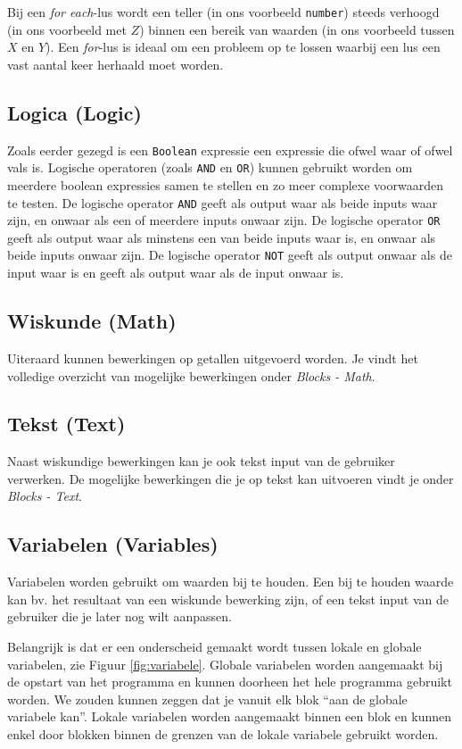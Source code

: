 Bij een \emph{for each}-lus wordt een teller (in ons voorbeeld \texttt{number}) steeds verhoogd (in ons voorbeeld met $Z$) binnen een bereik van waarden (in ons voorbeeld tussen $X$ en $Y$). Een \emph{for}-lus is ideaal om een probleem op te lossen waarbij een lus een vast aantal keer herhaald moet worden.

\subsection{Logica (Logic)}

Zoals eerder gezegd is een \texttt{Boolean} expressie een expressie die ofwel waar of ofwel vals is.
Logische operatoren (zoals \texttt{AND} en \texttt{OR}) kunnen gebruikt worden om meerdere boolean expressies samen te stellen en zo meer complexe voorwaarden te testen. De logische operator \texttt{AND} geeft als output waar als beide inputs waar zijn, en onwaar als een of meerdere inputs onwaar zijn. De logische operator \texttt{OR} geeft als output waar als minstens een van beide inputs waar is, en onwaar als beide inputs onwaar zijn.
De logische operator \texttt{NOT} geeft als output onwaar als de input waar is en geeft als output waar als de input onwaar is.

\subsection{Wiskunde (Math)}
Uiteraard kunnen bewerkingen op getallen uitgevoerd worden. Je vindt het volledige overzicht van mogelijke bewerkingen onder \emph{Blocks - Math}.

\subsection{Tekst (Text)}
Naast wiskundige bewerkingen kan je ook tekst input van de gebruiker verwerken. De mogelijke bewerkingen die je op tekst kan uitvoeren vindt je onder \emph{Blocks - Text}.

\subsection{Variabelen (Variables)}
Variabelen worden gebruikt om waarden bij te houden. Een bij te houden waarde kan bv. het resultaat van een wiskunde bewerking zijn, of een tekst input van de gebruiker die je later nog wilt aanpassen. 

Belangrijk is dat er een onderscheid gemaakt wordt tussen lokale en globale variabelen, zie Figuur \ref{fig:variabele}. Globale variabelen worden aangemaakt bij de opstart van het programma en kunnen doorheen het hele programma gebruikt worden. We zouden kunnen zeggen dat je vanuit elk blok \textquotedblleft aan de globale variabele kan\textquotedblright.
Lokale variabelen worden aangemaakt binnen een blok en kunnen enkel door blokken binnen de grenzen van de lokale variabele gebruikt worden.

